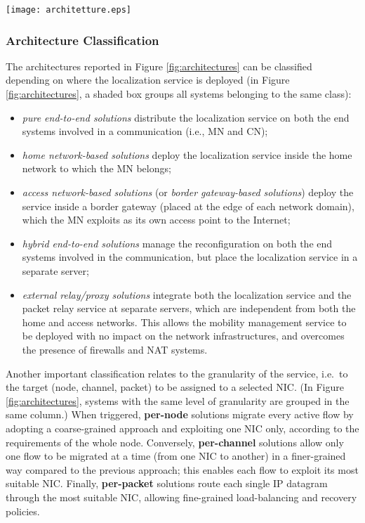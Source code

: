 \documentclass[preprint,12pt]{elsarticle}
\begin{document}
\begin{figure*}[t]
   \centering
   \texttt{[image: architetture.eps]}
   \caption{Mobility management architectures}
   \label{fig:architectures}
\end{figure*}

\subsubsection{Architecture Classification}

The architectures reported in Figure \ref{fig:architectures} can be 
classified depending on where the localization service is deployed (in Figure 
\ref{fig:architectures}, a shaded box groups all systems belonging to the same 
class): 
\begin{itemize}
  \item{\textit{pure end-to-end solutions}} distribute the localization service 
on both the end systems involved in a communication (i.e., MN and CN); 
  \item{\textit{home network-based solutions}} deploy the localization service inside the 
home network to which the MN belongs;
  \item{\textit{access network-based solutions}} (or \textit{border gateway-based 
solutions}) deploy the service inside a border gateway (placed at the edge of 
each network domain), which the MN exploits as its own access point to the Internet;
  \item{\textit{hybrid end-to-end solutions}} manage the reconfiguration on 
both the end systems involved in the communication, but place the 
localization service in a separate server;
  \item{\textit{external relay/proxy solutions}} integrate both the 
localization service and the packet relay service at separate servers, which 
are independent from both the home and access networks. This allows the 
mobility management service to be deployed with no impact on the network infrastructures, and
overcomes the presence of firewalls and NAT systems.  
\end{itemize}

Another important classification relates to the granularity of the service, 
i.e.~to the target (node, channel, packet) to be assigned to a selected NIC. 
(In Figure \ref{fig:architectures}, systems with the same level of granularity 
are grouped in the same column.) When triggered, \textbf{per-node} solutions 
migrate every active flow by adopting a coarse-grained approach and exploiting one NIC 
only, according to the requirements of the whole node. 
Conversely, \textbf{per-channel} solutions allow only one flow to be migrated at a 
time (from one NIC to another) in a finer-grained way compared to the 
previous approach; this enables each flow to exploit its most suitable NIC.
Finally, \textbf{per-packet} solutions route each single IP datagram through 
the most suitable NIC, allowing fine-grained load-balancing and recovery 
policies.  
\end{document}
